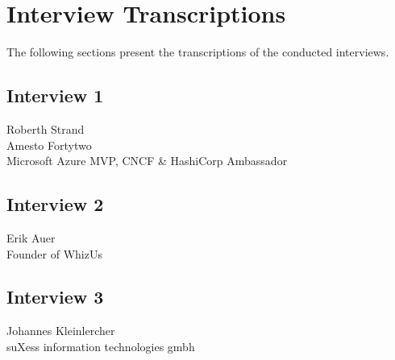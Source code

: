 \chapter{Interview Transcriptions}\label{appendix:interview-transcriptions}

The following sections present the transcriptions of the conducted interviews.

\section{Interview 1}

Roberth Strand \\
Amesto Fortytwo \\
Microsoft Azure MVP, CNCF \& HashiCorp Ambassador



\pagebreak

\section{Interview 2}

Erik Auer \\
Founder of WhizUs



\pagebreak

\section{Interview 3}

Johannes Kleinlercher \\
suXess information technologies gmbh



\pagebreak


